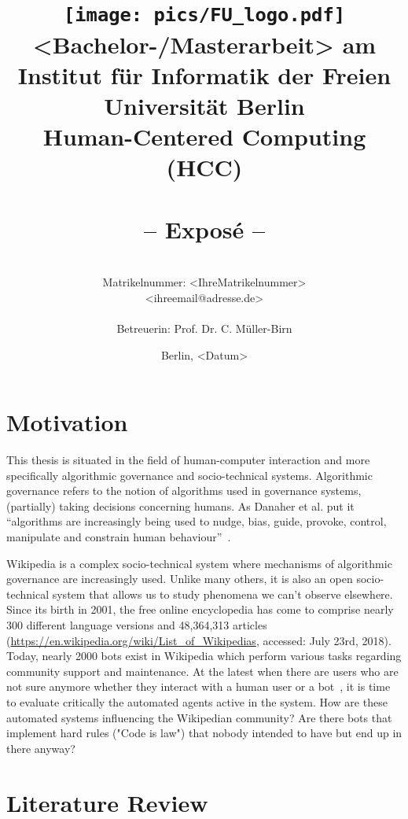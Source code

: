 \documentclass[pdftex,a4paper,11pt]{scrartcl}
\title{\texttt{[image: pics/FU\_logo.pdf]}\\
{\small <Bachelor-/Masterarbeit> am Institut für Informatik der Freien Universität Berlin}\\
{\small Human-Centered Computing (HCC)}\\
[6ex]
{\LARGE<Titel der Arbeit>}\\
{\normalsize-- Exposé --}}
\author{
{\emph{\normalsize<Ihr Vor- und Nachname>}}\\
{\normalsize Matrikelnummer: <IhreMatrikelnummer>}\\
{\normalsize <ihreemail@adresse.de>}\\\\
{\normalsize Betreuerin: Prof. Dr. C. Müller-Birn}
}
\date{\normalsize Berlin, <Datum>}
\newcommand{\blankpage}{
\newpage
\thispagestyle{empty}
\mbox{}
\newpage
}
\begin{document}
\maketitle

\thispagestyle{empty}  %

\blankpage

\setcounter{page}{1} %

\section{Motivation}

This thesis is situated in the field of human-computer interaction and more specifically algorithmic governance and socio-technical systems.
Algorithmic governance refers to the notion of algorithms used in governance systems, (partially) taking decisions concerning humans.
As Danaher et al. put it ``algorithms are increasingly being used to nudge, bias, guide, provoke, control, manipulate and constrain human behaviour''~\cite{DanaherEtAl2017}.

Wikipedia is a complex socio-technical system where mechanisms of algorithmic governance are increasingly used.
Unlike many others, it is also an open socio-technical system that allows us to study phenomena we can't observe elsewhere.
Since its birth in 2001, the free online encyclopedia has come to comprise nearly 300 different language versions and 48,364,313 articles (\url{https://en.wikipedia.org/wiki/List_of_Wikipedias}, accessed: July 23rd, 2018).
Today, nearly 2000 bots exist in Wikipedia which perform various tasks regarding community support and maintenance.
At the latest when there are users who are not sure anymore whether they interact with a human user or a bot~\cite{FordGeiger2012}, it is time to evaluate critically the automated agents active in the system.
How are these automated systems influencing the Wikipedian community?
Are there bots that implement hard rules ("Code is law") that nobody intended to have but end up in there anyway?



\section{Literature Review}
\end{document}
